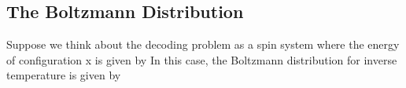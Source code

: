 \documentclass[letterpaper,english,10pt]{article}
\begin{document}
\subsection{The Boltzmann Distribution}
Suppose we think about the decoding problem as a spin system where the energy of configuration x is given by
In this case, the Boltzmann distribution for inverse temperature is given by
\end{document}
